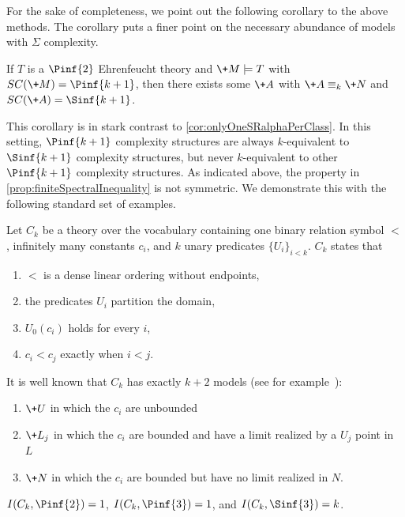 \documentclass{amsart}
\renewcommand{\-}{\text{-}}
\begin{document}
For the sake of completeness, we point out the following corollary to the above methods.
The corollary puts a finer point on the necessary abundance of models with $\Sigma$ complexity.

\begin{corollary}
If $T$ is a $\Pinf{2}$ Ehrenfeucht theory and $\+M\models T$ with $SC(\+M)=\Pinf{k+1}$, then there exists some $\+A$ with $\+A\equiv_k \+N$ and $SC(\+A)=\Sinf{k+1}$.
\end{corollary}

This corollary is in stark contrast to \cref{cor:onlyOneSRalphaPerClass}.
In this setting, $\Pinf{k+1}$ complexity structures are always $k$-equivalent to $\Sinf{k+1}$ complexity structures, but never $k$-equivalent to other $\Pinf{k+1}$ complexity structures.
As indicated above, the property in \cref{prop:finiteSpectralInequality} is not symmetric.
We demonstrate this with the following standard set of examples.

\begin{example}\label{ex:kcutModels}
Let $C_k$ be a theory over the vocabulary containing one binary relation symbol $<$, infinitely many constants $c_i$, and $k$ unary predicates $\{U_i\}_{i<k}$.
$C_k$ states that
\begin{enumerate}
	\item $<$ is a dense linear ordering without endpoints,
	\item the predicates $U_i$ partition the domain,
	\item $U_0(c_i)$ holds for every $i$,
	\item $c_i<c_j$ exactly when $i<j$.
\end{enumerate}
\end{example}

It is well known that $C_k$ has exactly $k+2$ models (see for example~\cite[Exercise 2.5.28]{marker2002}):
\begin{enumerate}
	\item $\+U$ in which the $c_i$ are unbounded
	\item $\+L_j$ in which the $c_i$ are bounded and have a limit realized by a $U_j$ point in $L$
	\item $\+N$ in which the $c_i$ are bounded but have no limit realized in $N$.
\end{enumerate}
\begin{proposition}\label{prop:kcutAnalysis}
$I(C_k,\Pinf{2})=1$, $I(C_k,\Pinf{3})=1$, and $I(C_k,\Sinf{3})=k$.
\end{proposition}
\end{document}
